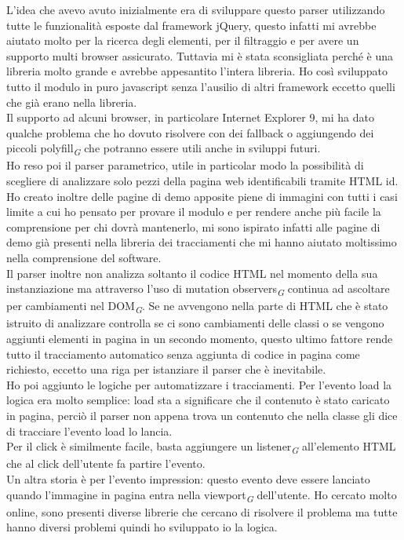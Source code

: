\documentclass[a4paper, 12pt, twoside, openright]{book}
\newcommand{\gloss}[1]{#1\textsubscript{\textit{\tiny{G}}}}
\begin{document}
L'idea che avevo avuto inizialmente era di sviluppare questo parser utilizzando tutte le funzionalità esposte dal framework jQuery, questo infatti mi avrebbe aiutato molto per la ricerca degli elementi, per il filtraggio e per avere un supporto multi browser assicurato. Tuttavia mi è stata sconsigliata perché è una libreria molto grande e avrebbe appesantito l'intera libreria. Ho così sviluppato tutto il modulo in puro javascript senza l'ausilio di altri framework eccetto quelli che già erano nella libreria.\\Il supporto ad alcuni browser, in particolare Internet Explorer 9, mi ha dato qualche problema che ho dovuto risolvere con dei fallback o aggiungendo dei piccoli \gloss{polyfill} che potranno essere utili anche in sviluppi futuri.\\
Ho reso poi il parser parametrico, utile in particolar modo la possibilità di scegliere di analizzare solo pezzi della pagina web identificabili tramite HTML id.\\
Ho creato inoltre delle pagine di demo apposite piene di immagini con tutti i casi limite a cui ho pensato per provare il modulo e per rendere anche più facile la comprensione per chi dovrà mantenerlo, mi sono ispirato infatti alle pagine di demo già presenti nella libreria dei tracciamenti che mi hanno aiutato moltissimo nella comprensione del software.\\
Il parser inoltre non analizza soltanto il codice HTML nel momento della sua instanziazione ma attraverso l'uso di \gloss{mutation observers} continua ad ascoltare per cambiamenti nel \gloss{DOM}. Se ne avvengono nella parte di HTML che è stato istruito di analizzare controlla se ci sono cambiamenti delle classi o se vengono aggiunti elementi in pagina in un secondo momento, questo ultimo fattore rende tutto il tracciamento automatico senza aggiunta di codice in pagina come richiesto, eccetto una riga per istanziare il parser che è inevitabile.\\
Ho poi aggiunto le logiche per automatizzare i tracciamenti. Per l'evento load la logica era molto semplice: load sta a significare che il contenuto è stato caricato in pagina, perciò il parser non appena trova un contenuto che nella classe gli dice di tracciare l'evento load lo lancia.\\
Per il click è similmente facile, basta aggiungere un \gloss{listener} all'elemento HTML che al click dell'utente fa partire l'evento.\\
Un altra storia è per l'evento impression: questo evento deve essere lanciato quando l'immagine in pagina entra nella \gloss{viewport} dell'utente. Ho cercato molto online, sono presenti diverse librerie che cercano di risolvere il problema ma tutte hanno diversi problemi quindi ho sviluppato io la logica.\\
\end{document}
